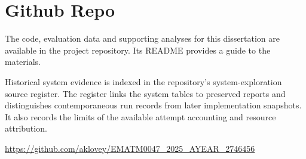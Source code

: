 \chapter{Github Repo}\label{ch:A}

The code, evaluation data and supporting analyses for this dissertation are available in the project repository. Its README provides a guide to the materials.

Historical system evidence is indexed in the repository's system-exploration source register. The register links the system tables to preserved reports and distinguishes contemporaneous run records from later implementation snapshots. It also records the limits of the available attempt accounting and resource attribution.

\medskip
\url{https://github.com/aklovey/EMATM0047_2025_AYEAR_2746456}

